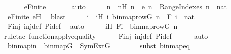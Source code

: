 \begin{isabellebody}
\ \ \ \ \isamarkupfalse%
\ e{\isacharunderscore}{\kern0pt}Finite\ \isanewline
\ \ \ \ \isamarkupfalse%
\ auto\isanewline
\ \ \isamarkupfalse%
\ \isamarkupfalse%
\ n\ \ nH{\isacharcolon}{\kern0pt}\ {\isachardoublequoteopen}n\ {\isasymnotin}\ e{\isachardoublequoteclose}\ {\isachardoublequoteopen}n\ {\isasymin}\ {\isacharquery}{\kern0pt}RangeIndexes{\isachardoublequoteclose}\ {\isachardoublequoteopen}n\ {\isasymin}\ nat{\isachardoublequoteclose}\ \isamarkupfalse%
\ e{\isacharunderscore}{\kern0pt}Finite\ eH\ \isamarkupfalse%
\ blast\isanewline
\ \ \isamarkupfalse%
\ \isamarkupfalse%
\ i\ \ iH{\isacharcolon}{\kern0pt}\ {\isachardoublequoteopen}{\isacharless}{\kern0pt}i{\isacharcomma}{\kern0pt}\ binmap{\isacharunderscore}{\kern0pt}row{\isacharparenleft}{\kern0pt}G{\isacharcomma}{\kern0pt}\ n{\isacharparenright}{\kern0pt}{\isachargreater}{\kern0pt}\ {\isasymin}\ F{\isachardoublequoteclose}\ {\isachardoublequoteopen}i\ {\isasymin}\ nat{\isachardoublequoteclose}\ \isamarkupfalse%
\ Finj\ inj{\isacharunderscore}{\kern0pt}def\ Pi{\isacharunderscore}{\kern0pt}def\ \isamarkupfalse%
\ auto\isanewline
\ \ \isamarkupfalse%
\ \isamarkupfalse%
\ iH{\isacharprime}{\kern0pt}{\isacharcolon}{\kern0pt}\ {\isachardoublequoteopen}F{\isacharbackquote}{\kern0pt}i\ {\isacharequal}{\kern0pt}\ binmap{\isacharunderscore}{\kern0pt}row{\isacharparenleft}{\kern0pt}G{\isacharcomma}{\kern0pt}\ n{\isacharparenright}{\kern0pt}{\isachardoublequoteclose}\ \isanewline
\ \ \ \ \isamarkupfalse%
{\isacharparenleft}{\kern0pt}rule{\isacharunderscore}{\kern0pt}tac\ function{\isacharunderscore}{\kern0pt}apply{\isacharunderscore}{\kern0pt}equality{\isacharparenright}{\kern0pt}\isanewline
\ \ \ \ \isamarkupfalse%
\ Finj\ inj{\isacharunderscore}{\kern0pt}def\ Pi{\isacharunderscore}{\kern0pt}def\isanewline
\ \ \ \ \isamarkupfalse%
\ auto\isanewline
\isanewline
\ \ \isamarkupfalse%
\ binmapin\ {\isacharcolon}{\kern0pt}\ {\isachardoublequoteopen}binmap{\isacharparenleft}{\kern0pt}G{\isacharparenright}{\kern0pt}\ {\isasymin}\ SymExt{\isacharparenleft}{\kern0pt}G{\isacharparenright}{\kern0pt}{\isachardoublequoteclose}\ \isanewline
\ \ \ \ \ \ \isamarkupfalse%
{\isacharparenleft}{\kern0pt}subst\ binmap{\isacharunderscore}{\kern0pt}eq{\isacharparenright}{\kern0pt}\isanewline
\ \ \ \ \isamarkupfalse%

\end{isabellebody}
